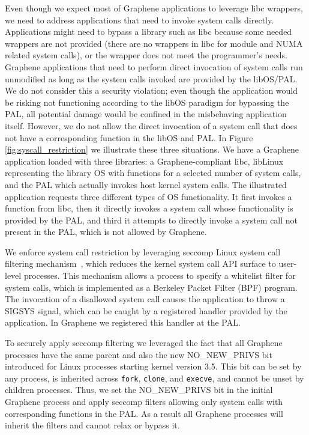 Even though we expect most of Graphene applications to leverage libc
wrappers, we need to address applications that need to invoke system
calls directly. Applications might need to bypass a library such as
libc because some needed wrappers are not provided (there are no
wrappers in libc for module and NUMA related system calls), or the
wrapper does not meet the programmer’s needs. Graphene applications
that need to perform direct invocation of system calls run unmodified
as long as the system calls invoked are provided by the libOS/PAL. We
do not consider this a security violation; even though the application
would be risking not functioning according to the libOS paradigm for
bypassing the PAL, all potential damage would be confined in the
misbehaving application itself.  However, we do not allow the direct
invocation of a system call that does not have a corresponding
function in the libOS and PAL. In Figure \ref{fig:syscall_restriction}
we illustrate these three situations. We have a Graphene application
loaded with three libraries: a Graphene-compliant libc, libLinux
representing the library OS with functions for a selected number of
system calls, and the PAL which actually invokes host kernel system
calls. The illustrated application requests three different types of
OS functionality. It first invokes a function from libc, then it
directly invokes a system call whose functionality is provided by the
PAL, and third it attempts to directly invoke a system call not
present in the PAL, which is not allowed by Graphene.

We enforce system call restriction by leveraging seccomp Linux system
call filtering mechanism~\cite{seccomp}, which reduces the kernel
system call API surface to user-level processes. This mechanism allows
a process to specify a whitelist filter for system calls, which is
implemented as a Berkeley Packet Filter (BPF) program. The invocation
of a disallowed system call causes the application to throw a SIGSYS
signal, which can be caught by a registered handler provided by the
application. In Graphene we registered this handler at the PAL.

To securely apply seccomp filtering we leveraged the fact that all
Graphene processes have the same parent and also the new
NO\_NEW\_PRIVS bit introduced for Linux processes starting kernel
version 3.5. This bit can be set by any process, is inherited across
{\tt fork}, {\tt clone}, and {\tt execve}, and cannot be unset by
children processes. Thus, we set the NO\_NEW\_PRIVS bit in the initial
Graphene process and apply seccomp filters allowing only system calls
with corresponding functions in the PAL. As a result all Graphene
processes will inherit the filters and cannot relax or bypass it.



